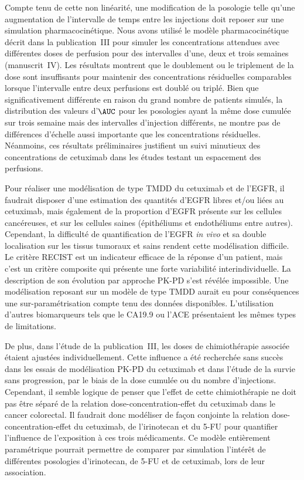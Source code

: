 Compte tenu de cette non linéarité, une modification de la posologie telle qu'une augmentation de l'intervalle de temps entre les injections doit reposer sur une simulation pharmacocinétique. Nous avons utilisé le modèle pharmacocinétique décrit dans la publication~III pour simuler les concentrations attendues avec différentes doses de perfusion pour des intervalles d'une, deux et trois semaines (manuscrit~IV). Les résultats montrent que le doublement ou le triplement de la dose sont insuffisants pour maintenir des concentrations résiduelles comparables lorsque l'intervalle entre deux perfusions est doublé ou triplé. Bien que significativement différente en raison du grand nombre de patients simulés, la distribution des valeurs d'$\AUC$ pour les posologies ayant la même dose cumulée sur trois semaine mais des intervalles d'injection différents, ne montre pas de différences d'échelle aussi importante que les concentrations résiduelles. Néanmoins, ces résultats préliminaires justifient un suivi minutieux des concentrations de cetuximab dans les études testant un espacement des perfusions.  

Pour réaliser une modélisation de type TMDD du cetuximab et de l'EGFR, il faudrait disposer d'une estimation des quantités d'EGFR libres et/ou liées au cetuximab, mais également de la proportion d'EGFR présente sur les cellules cancéreuses, et sur les cellules saines (épithéliums et endothéliums entre autres). Cependant, la difficulté de quantification de l'EGFR \textit{in vivo} et sa double localisation sur les tissus tumoraux et sains rendent cette modélisation difficile. Le critère RECIST est un indicateur efficace de la réponse d'un patient, mais c'est un critère composite qui présente une forte variabilité interindividuelle. La description de son évolution par approche PK-PD s'est révélée impossible. Une modélisation reposant sur un modèle de type TMDD aurait eu pour conséquences une sur-paramétrisation compte tenu des données disponibles. L'utilisation d'autres biomarqueurs tels que le CA19.9 ou l'ACE présentaient les mêmes types de limitations. 

De plus, dans l'étude de la publication~III, les doses de chimiothérapie associée étaient ajustées individuellement. Cette influence a été recherchée sans succès dans les essais de modélisation PK-PD du cetuximab et dans l'étude de la survie sans progression, par le biais de la dose cumulée ou du nombre d'injections. Cependant, il semble logique de penser que l'effet de cette chimiothérapie ne doit pas être séparé de la relation dose-concentration-effet du cetuximab dans le cancer colorectal. Il faudrait donc modéliser de façon conjointe la relation dose-concentration-effet du cetuximab, de l'irinotecan et du 5-FU pour quantifier l'influence de l'exposition à ces trois médicaments. Ce modèle entièrement paramétrique pourrait permettre de comparer par simulation l'intérêt de différentes posologies d'irinotecan, de 5-FU et de cetuximab, lors de leur association. 

